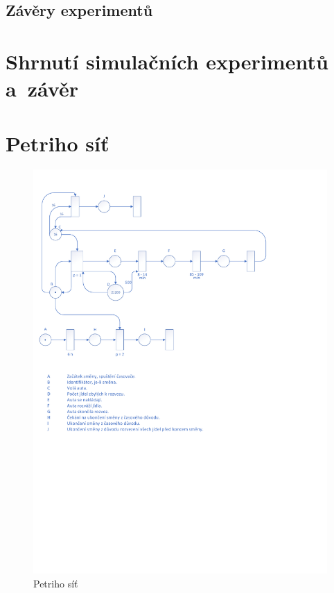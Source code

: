 \documentclass[a4paper, 11pt]{article}
\begin{document}
	\subsection{Závěry experimentů}



	\section{Shrnutí simulačních experimentů a~závěr}



	\clearpage
	
	\renewcommand{\refname}{Literatura}
	



	\clearpage
	\appendix

	\section{Petriho síť}
	\label{appendix:petri_net}
	\begin{figure}[!ht]
		\centering
		\vspace{-1.2cm}
		\includegraphics[width=0.95\linewidth]{inc/petri_net.pdf}
		\caption{Petriho síť}
		\label{figure:petri_net}
	\end{figure}
\end{document}
